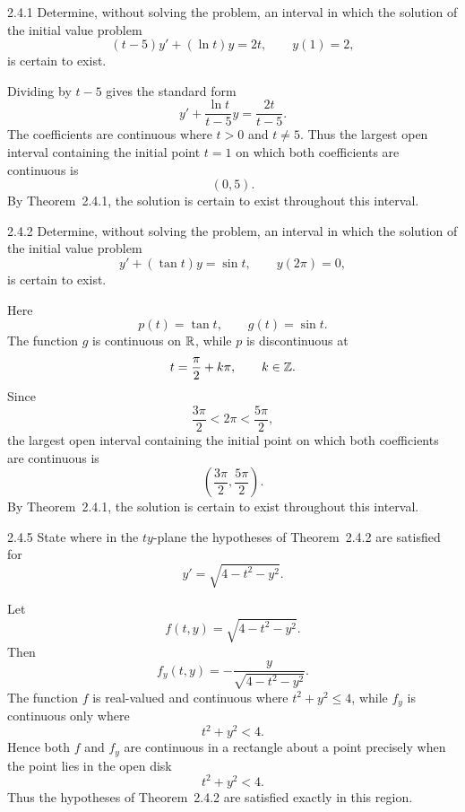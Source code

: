 \documentclass[11pt,oneside]{article}
\begin{document}

\begin{problem}{2.4.1}
Determine, without solving the problem, an interval in which the solution of the initial value problem
\[
    (t-5)y'+(\ln t)y=2t,
    \qquad
    y(1)=2,
\]
is certain to exist.
\end{problem}

\begin{solution}
Dividing by $t-5$ gives the standard form
\[
    y'+\frac{\ln t}{t-5}y=\frac{2t}{t-5}.
\]
The coefficients are continuous where $t>0$ and $t\neq5$. Thus the largest open interval containing the initial point $t=1$ on which both coefficients are continuous is
\[
    \boxed{(0,5)}.
\]
By Theorem~2.4.1, the solution is certain to exist throughout this interval.
\end{solution}

\begin{problem}{2.4.2}
Determine, without solving the problem, an interval in which the solution of the initial value problem
\[
    y'+(\tan t)y=\sin t,
    \qquad
    y(2\pi)=0,
\]
is certain to exist.
\end{problem}

\begin{solution}
Here
\[
    p(t)=\tan t,
    \qquad
    g(t)=\sin t.
\]
The function $g$ is continuous on $\mathbb{R}$, while $p$ is discontinuous at
\[
    t=\frac{\pi}{2}+k\pi,
    \qquad
    k\in\mathbb{Z}.
\]
Since
\[
    \frac{3\pi}{2}<2\pi<\frac{5\pi}{2},
\]
the largest open interval containing the initial point on which both coefficients are continuous is
\[
    \boxed{\left(\frac{3\pi}{2},\frac{5\pi}{2}\right)}.
\]
By Theorem~2.4.1, the solution is certain to exist throughout this interval.
\end{solution}

\begin{problem}{2.4.5}
State where in the $ty$-plane the hypotheses of Theorem~2.4.2 are satisfied for
\[
    y'=\sqrt{4-t^2-y^2}.
\]
\end{problem}

\begin{solution}
Let
\[
    f(t,y)=\sqrt{4-t^2-y^2}.
\]
Then
\[
    f_y(t,y)=-\frac{y}{\sqrt{4-t^2-y^2}}.
\]
The function $f$ is real-valued and continuous where $t^2+y^2\leq4$, while $f_y$ is continuous only where
\[
    t^2+y^2<4.
\]
Hence both $f$ and $f_y$ are continuous in a rectangle about a point precisely when the point lies in the open disk
\[
    \boxed{t^2+y^2<4}.
\]
Thus the hypotheses of Theorem~2.4.2 are satisfied exactly in this region.
\end{solution}
\end{document}
